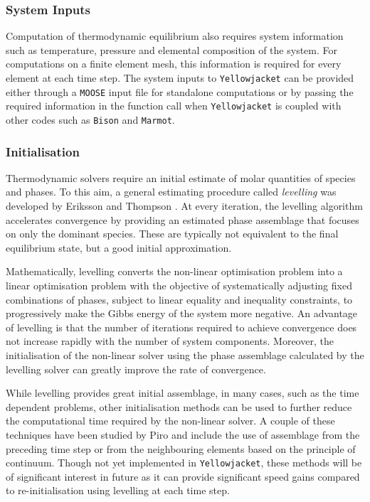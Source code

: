 	\subsubsection*{System Inputs}
    Computation of thermodynamic equilibrium also requires system information such as temperature, pressure and elemental composition of the system. For computations on a finite element mesh, this information is required for every element at each time step. The system inputs to \texttt{Yellowjacket} can be provided either through a \texttt{MOOSE} input file for standalone computations or by passing the required information in the function call when \texttt{Yellowjacket} is coupled with other codes such as \texttt{Bison} and \texttt{Marmot}.
    
    	\subsubsection*{Initialisation}
    	Thermodynamic solvers require an initial estimate of molar quantities of species and phases. To this aim, a general estimating procedure called \emph{levelling} was developed by Eriksson and Thompson \cite{ERIKSSON1989389}. At every iteration, the levelling algorithm accelerates convergence by providing an estimated phase assemblage that focuses on only the dominant species. These are typically not equivalent to the final equilibrium state, but a good initial approximation. 

    	Mathematically, levelling converts the non-linear optimisation problem into a linear optimisation problem with the objective of systematically adjusting fixed combinations of phases, subject to linear equality and inequality constraints, to progressively make the Gibbs energy of the system more negative. An advantage of levelling is that the number of iterations required to achieve convergence does not increase rapidly with the number of system components. Moreover, the initialisation of the non-linear solver using the phase assemblage calculated by the levelling solver can greatly improve the rate of convergence.
    
    	While levelling provides great initial assemblage, in many cases, such as the time dependent problems, other initialisation methods can be used to further reduce the computational time required by the non-linear solver. A couple of these techniques have been studied by Piro \cite{Piro17} and include the use of assemblage from the preceding time step or from the neighbouring elements based on the principle of continuum. Though not yet implemented in \texttt{Yellowjacket}, these methods will be of significant interest in future as it can provide significant speed gains compared to re-initialisation using levelling at each time step.
	
